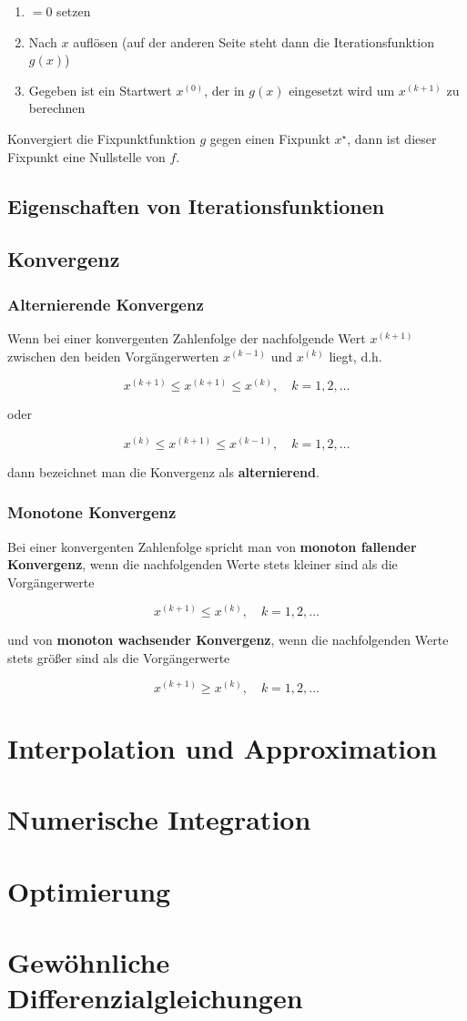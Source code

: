 \documentclass[a4paper, twoside]{article}
\begin{document}
\begin{enumerate}
\item \(=0\) setzen
\item Nach \(x\) auflösen (auf der anderen Seite steht dann die Iterationsfunktion \(g(x)\))
\item Gegeben ist ein Startwert \(x^{(0)}\), der in \(g(x)\) eingesetzt wird um \(x^{(k+1)}\) zu berechnen
\end{enumerate}

Konvergiert die Fixpunktfunktion \(g\) gegen einen Fixpunkt \(x^{\star}\), dann ist dieser Fixpunkt eine Nullstelle von \(f\).

\subsection{Eigenschaften von Iterationsfunktionen}

\subsection{Konvergenz}

\subsubsection{Alternierende Konvergenz}

Wenn bei einer konvergenten Zahlenfolge der nachfolgende Wert \(x^{(k+1)}\) zwischen den beiden Vorgängerwerten \(x^{(k-1)}\) und \(x^{(k)}\) liegt, d.h.

\[x^{(k+1)} \leq x^{(k+1)} \leq x^{(k)},\quad k = 1, 2, \ldots\]

oder

\[x^{(k)} \leq x^{(k+1)} \leq x^{(k-1)},\quad k = 1, 2, \ldots\]

dann bezeichnet man die Konvergenz als \textbf{alternierend}.

\subsubsection{Monotone Konvergenz}

Bei einer konvergenten Zahlenfolge spricht man von \textbf{monoton fallender Konvergenz},
wenn die nachfolgenden Werte stets kleiner sind als die Vorgängerwerte

\[x^{(k+1)} \leq x^{(k)},\quad k = 1, 2, \ldots\]

und von \textbf{monoton wachsender Konvergenz}, wenn die nachfolgenden Werte stets
größer sind als die Vorgängerwerte

\[x^{(k+1)} \geq x^{(k)},\quad k = 1, 2, \ldots\]

\section{Interpolation und Approximation}

\section{Numerische Integration}

\section{Optimierung}

\section{Gewöhnliche Differenzialgleichungen}
\end{document}

